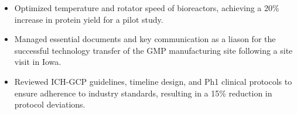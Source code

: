 \begin{itemize}
    \setlength{\itemindent}{0.5em}
    \item \small
    Optimized temperature and rotator speed of bioreactors, achieving a 20\% increase in protein yield for a pilot study.
    \item Managed essential documents and key communication as a liason for the successful technology transfer of the GMP manufacturing site 
    following a site visit in Iowa.
    \item Reviewed ICH-GCP guidelines, timeline design, and Ph1 clinical protocols to ensure adherence to industry standards,
    resulting in a 15\% reduction in protocol deviations. 

\end{itemize}
\smallskip